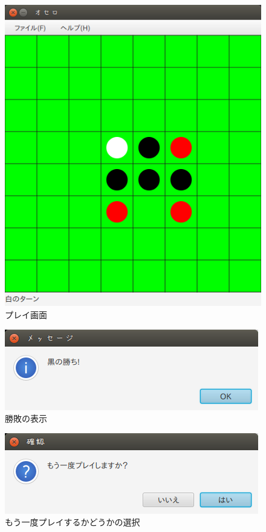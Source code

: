 \documentclass[uplatex,titlepage]{jsarticle}
\begin{document}
\begin{figure}[h]
\begin{center}
\includegraphics[scale=0.5]{オセロ_039}
\caption{プレイ画面}
\end{center}
\end{figure}
\begin{figure}[h]
\begin{center}
\includegraphics[scale=0.5]{メッセージ_036}
\caption{勝敗の表示}
\end{center}
\end{figure}
\begin{figure}[h]
\begin{center}
\includegraphics[scale=0.5]{確認_037}
\caption{もう一度プレイするかどうかの選択}
\end{center}
\end{figure}
\end{document}
